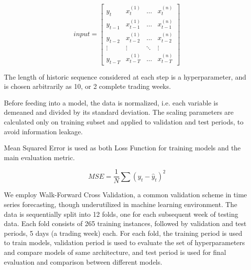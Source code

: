 \documentclass[review, authoryear]{elsarticle}
\begin{document}
\begin{equation}
input = \begin{bmatrix} 
    y_{t} & x^{(1)}_{t} & \dots & x^{(n)}_{t} \\[1ex]
    y_{t-1} & x^{(1)}_{t-1} & \dots & x^{(n)}_{t-1} \\[1ex]
    y_{t-2} & x^{(1)}_{t-2} & \dots & x^{(n)}_{t-2} \\[1ex]
    \vdots & \vdots & \ddots & \vdots \\[1ex]
    y_{t-T} & x^{(1)}_{t-T} & \dots & x^{(n)}_{t-T} 
\end{bmatrix}
\end{equation}

The length of historic sequence considered at each step is a hyperparameter, and is chosen arbitrarily as 10, or 2 complete trading weeks.

Before feeding into a model, the data is normalized, i.e. each variable is demeaned and divided by its standard deviation. The scaling parameters are calculated only on training subset and applied to validation and test periods, to avoid information leakage.

Mean Squared Error is used as both Loss Function for training models and the main evaluation metric.

\begin{equation}
MSE = \frac{1}{N} \sum (y_t - \hat{y}_t)^2
\end{equation}

We employ Walk-Forward Cross Validation, a common validation scheme in time series forecasting, though underutilized in machine learning environment.
The data is sequentially split into 12 folds, one for each subsequent week of testing data. Each fold consists of 265 training instances, followed by validation and test periods, 5 days (a trading week) each. For each fold, the training period is used to train models, validation period is used to evaluate the set of hyperparameters and compare models of same architecture, and test period is used for final evaluation and comparison between different models.
\end{document}
